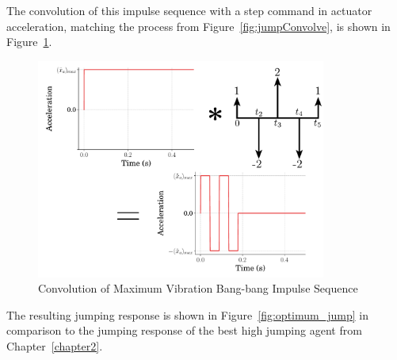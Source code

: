 The convolution of this impulse sequence with a step command in actuator acceleration, matching the process from Figure~\ref{fig:jumpConvolve}, is shown in Figure~\ref{fig:2x_bang_bang_conv}.
%
\begin{figure}[tb!]
\begin{center}
\includegraphics[width=0.85\textwidth]{Figures/Ch3/input_shaping/optimal_jump_convolve.pdf}  
\caption{Convolution of Maximum Vibration Bang-bang Impulse Sequence}
\label{fig:2x_bang_bang_conv}
\end{center}
\vspace{-0.2in}
\end{figure}
%
The resulting jumping response is shown in Figure~\ref{fig:optimum_jump} in comparison to the jumping response of the best high jumping agent from Chapter~\ref{chapter2}.
%
